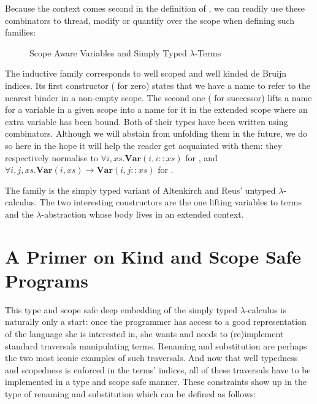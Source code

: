 Because the context comes second in the definition of , we
can readily use these combinators to thread, modify or quantify over the
scope when defining such families:

\begin{figure}[h]
\begin{minipage}{0.40\textwidth}
\end{minipage}
\begin{minipage}{0.5\textwidth}
\end{minipage}
\caption{Scope Aware Variables and Simply Typed $\lambda$-Terms\label{scoped-untyped}}
\end{figure}

The inductive family  corresponds to well scoped and well kinded
de Bruijn~\citeyear{de1972lambda}
indices. Its first constructor ( for zero) states that we have a name to refer to
the nearest binder in a non-empty scope. The second one ( for successor) lifts a
name for a variable in a given scope into a name for it in the extended scope where
an extra variable has been bound. Both of their types have been written using combinators.
Although we will abstain from unfolding them in the future, we do so here in the hope
it will help the reader get acquainted with them: they respectively normalise to
$\forall i, xs. \mathbf{Var}(i, i :\!: \mathit{xs})$ for ,
and $\forall i, j, xs. \mathbf{Var}(i, \mathit{xs}) \rightarrow \mathbf{Var}(i, j :\!: \mathit{xs})$ for .

The   family  is the simply typed variant of Altenkirch
and Reus' untyped $\lambda$-calculus. The two interesting constructors are the one
lifting variables to terms and the $\lambda$-abstraction whose body lives in an
extended context.




\section{A Primer on Kind and Scope Safe Programs}\label{section:primer-program}

This type and scope safe deep embedding of the simply typed $\lambda$-calculus is
naturally only a start: once the programmer has access to a good
representation of the language she is interested in, she wants and
needs to (re)implement standard traversals manipulating terms.
Renaming and substitution are perhaps the two most iconic examples
of such traversals. And now that well typedness and scopedness is enforced in
the terms' indices, all of these traversals have to be implemented
in a type and scope safe manner. These constraints show up in the type of
renaming and substitution which can be defined as follows:

